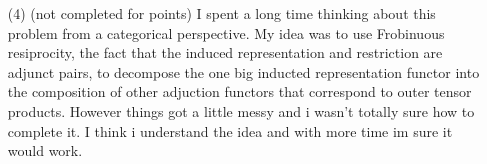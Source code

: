 \documentclass[12pt]{amsart}
\begin{document}
\begin{itemize}
\item[(4)] (not completed for points) I spent a long time thinking about this problem from a categorical perspective. My idea was to use Frobinuous resiprocity, the fact that the induced representation and restriction are adjunct pairs, to decompose the one big inducted representation functor into the composition of other adjuction functors that correspond to outer tensor products. However things got a little messy and i wasn't totally sure how to complete it. I think i understand the idea and with more time im sure it would work.\\  %



\end{itemize}
\end{document}
